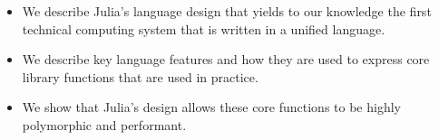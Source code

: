 \begin{itemize}
\item We describe Julia's language design that yields to our knowledge the first technical computing system that is written in a unified language.
\item We describe key language features and how they are used to express core library functions that are used in practice.
\item We show that Julia's design allows these core functions to be highly polymorphic and performant.
\end{itemize}

%



